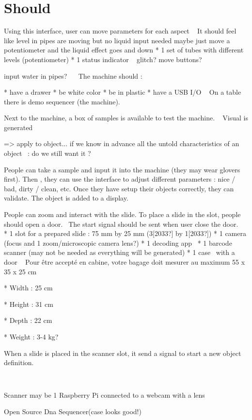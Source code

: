 \section{Should}

Using this interface, user can move parameters for each aspect
~
It should feel like level in pipes are moving but no liquid input needed
maybe just move a potentiometer and the liquid effect goes and down
* 1 set of tubes with different levels (potentiometer)
* 1 status indicator
~
glitch?
move buttons?

input water in pipes?~
~
The machine should :

* have a drawer
* be white color
* be in plastic
* have a USB I/O
~
On a table there is demo sequencer (the machine).

Next to the machine, a box of samples is available to test the machine.
~
Visual is generated
~

={\textgreater} apply to object... if we know in advance all the untold
characteristics of an object~ : do we still want it ?
~

People can take a sample and input it into the machine (they may wear
glovers first).
Then , they can use the interface to adjust different parameters : nice
/ bad, dirty / clean, etc.
Once they have setup their objects correctly, they can validate.
The object is added to a display.

\bigskip

People can zoom and interact with the slide.
To place a slide in the slot, people should open a door.~
The start signal should be sent when user close the door.
~
* 1 slot for a prepared slide : 75 mm by 25 mm (3[2033?] by 1[2033?])
* 1 camera (focus and 1 zoom/microscopic camera lens?)
* 1 decoding app~
* 1 barcode scanner (may not be needed as everything will be generated)
* 1 case~ with a door
~
Pour \^etre accept\'e en cabine, votre bagage doit mesurer au maximum 55
x 35 x 25 cm~

* Width : 25 cm

* Height : 31 cm

* Depth : 22 cm

* Weight : 3-4 kg?


\bigskip

When a slide is placed in the scanner slot, it send a signal to start a
new object definition.

~

Scanner may be 1 Raspberry Pi connected to a webcam with a lens

Open Source Dna Sequencer(case looks good!)
~

